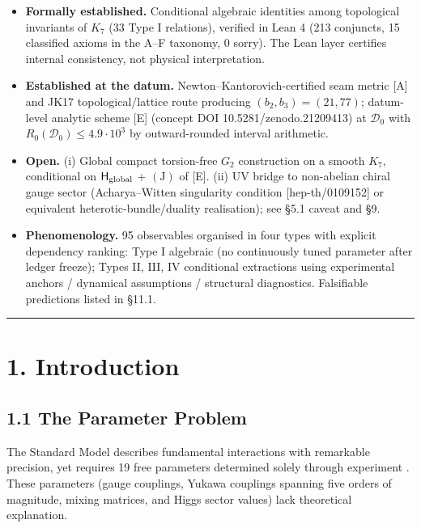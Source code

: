 \documentclass[11pt,a4paper]{article}
\begin{document}
\begin{itemize}
\tightlist
\item
  \textbf{Formally established.} Conditional algebraic identities among topological invariants of \(K_7\) (33 Type I relations), verified in Lean 4 (213 conjuncts, 15 classified axioms in the A--F taxonomy, 0 sorry). The Lean layer certifies internal consistency, not physical interpretation.
\item
  \textbf{Established at the datum.} Newton--Kantorovich-certified seam metric {[}A{]} and JK17 topological/lattice route producing \((b_2, b_3) = (21, 77)\); datum-level analytic scheme {[}E{]} (concept DOI 10.5281/zenodo.21209413) at \(\mathcal D_0\) with \(R_0(\mathcal D_0) \le 4.9 \cdot 10^3\) by outward-rounded interval arithmetic.
\item
  \textbf{Open.} (i) Global compact torsion-free \(G_2\) construction on a smooth \(K_7\), conditional on \(\mathsf H_{\rm global}\) + \((\mathrm J)\) of {[}E{]}. (ii) UV bridge to non-abelian chiral gauge sector (Acharya--Witten singularity condition {[}hep-th/0109152{]} or equivalent heterotic-bundle/duality realisation); see §5.1 caveat and §9.
\item
  \textbf{Phenomenology.} 95 observables organised in four types with explicit dependency ranking: Type I algebraic (no continuously tuned parameter after ledger freeze); Types II, III, IV conditional extractions using experimental anchors / dynamical assumptions / structural diagnostics. Falsifiable predictions listed in §11.1.
\end{itemize}

\begin{center}\rule{\linewidth}{0.5pt}\end{center}

\section{1. Introduction}\label{introduction}

\subsection{1.1 The Parameter Problem}\label{the-parameter-problem}

The Standard Model describes fundamental interactions with remarkable precision, yet requires 19 free parameters determined solely through experiment \cite{1}. These parameters (gauge couplings, Yukawa couplings spanning five orders of magnitude, mixing matrices, and Higgs sector values) lack theoretical explanation.
\end{document}
